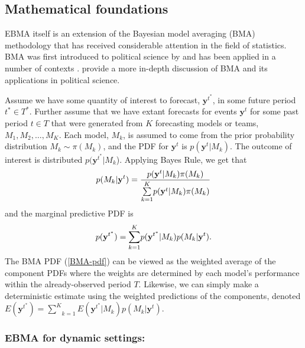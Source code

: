 \subsection{Mathematical foundations}

EBMA itself is an extension of the Bayesian model averaging (BMA)
methodology \citep[c.f.,][]{Madigan:1994, Draper:1995, Raftery:1995,
  Hoeting:1999, Clyde:2003, Raftery:2003, Clyde:2004} that has
received considerable attention in the field of statistics. BMA was
first introduced to political science by \citet{Bartels:1997} and has
been applied in a number of contexts \citep[e.g.,][]{Bartels:2001,
  Gill:2004, Imai:2004,
  Geer:2006b}. 
provide a more in-depth discussion of BMA and its applications in
political science.


Assume we have some quantity of interest to forecast,
$\mathbf{y}^{t^*}$, in some future period $t^\ast \in
T^\ast$.  Further assume that we have extant forecasts for events
$\mathbf{y}^t$ for some past period $t \in T$ that were generated from
$K$ forecasting models or teams, $M_1, M_2, \ldots, M_K$. Each model,
$M_k$, is assumed to come from the prior probability distribution
$M_k\sim \pi(M_k)$, and the PDF for $\mathbf{y}^t$ is
$p(\mathbf{y}^t|M_k)$. The outcome of interest is distributed
$p(\mathbf{y}^{t^*}|M_k$).  Applying Bayes Rule, we get that
\begin{equation} \small
p(M_k|\mathbf{y}^t) = \frac{p(\mathbf{y}^t|M_k)\pi(M_k)}{\underset{k=1}{\overset{K}{\sum}}p(\mathbf{y}^t|M_k)\pi(M_k)}
\end{equation}
\noindent and the marginal predictive PDF is
\begin{equation}
\label{BMA-pdf}
\small
p(\mathbf{y}^{t^*}) = \underset{k=1}{\overset{K}{\sum}} p(\mathbf{y}^{t^*}|M_k)p(M_k|\mathbf{y}^{t}).
\end{equation}
The BMA PDF (\ref{BMA-pdf}) can be viewed as the weighted average of
the component PDFs where the weights are determined by each model's
performance within the already-observed period $T$.  Likewise, we can
simply make a deterministic estimate using the weighted predictions of
the components, denoted
$E(\mathbf{y}^{t^*}) = \underset{k=1}{\overset{K}{\sum}}
E(\mathbf{y}^{t^*}|M_k)p(M_k|\mathbf{y}^{t})$. 

\subsubsection{EBMA for dynamic settings: }

